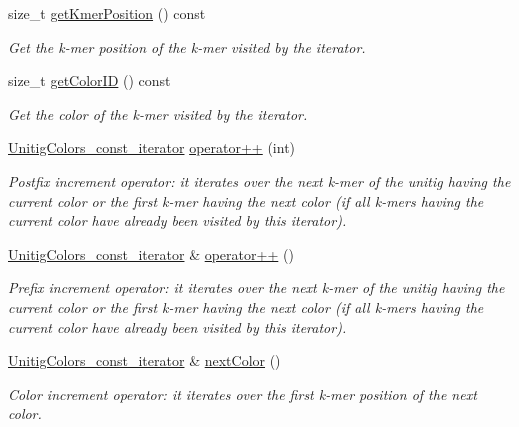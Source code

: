 \begin{DoxyCompactItemize}
size\+\_\+t \hyperlink{classUnitigColors_1_1UnitigColors__const__iterator_aac088e18802033a09a5ff1336522fbca}{get\+Kmer\+Position} () const
\begin{DoxyCompactList}\small\item\em Get the k-\/mer position of the k-\/mer visited by the iterator. \end{DoxyCompactList}\item 
size\+\_\+t \hyperlink{classUnitigColors_1_1UnitigColors__const__iterator_a1274e2d24b65f1b9ed2a473c9bf99302}{get\+Color\+ID} () const
\begin{DoxyCompactList}\small\item\em Get the color of the k-\/mer visited by the iterator. \end{DoxyCompactList}\item 
\hyperlink{classUnitigColors_1_1UnitigColors__const__iterator}{Unitig\+Colors\+\_\+const\+\_\+iterator} \hyperlink{classUnitigColors_1_1UnitigColors__const__iterator_a8ab4940bd251e29329edb8e0e46483b4}{operator++} (int)
\begin{DoxyCompactList}\small\item\em Postfix increment operator\+: it iterates over the next k-\/mer of the unitig having the current color or the first k-\/mer having the next color (if all k-\/mers having the current color have already been visited by this iterator). \end{DoxyCompactList}\item 
\hyperlink{classUnitigColors_1_1UnitigColors__const__iterator}{Unitig\+Colors\+\_\+const\+\_\+iterator} \& \hyperlink{classUnitigColors_1_1UnitigColors__const__iterator_acf6c4cff3345fa23053dbd9be046974f}{operator++} ()
\begin{DoxyCompactList}\small\item\em Prefix increment operator\+: it iterates over the next k-\/mer of the unitig having the current color or the first k-\/mer having the next color (if all k-\/mers having the current color have already been visited by this iterator). \end{DoxyCompactList}\item 
\hyperlink{classUnitigColors_1_1UnitigColors__const__iterator}{Unitig\+Colors\+\_\+const\+\_\+iterator} \& \hyperlink{classUnitigColors_1_1UnitigColors__const__iterator_ae7c489b968f06a0b713bd7244d75aeca}{next\+Color} ()
\begin{DoxyCompactList}\small\item\em Color increment operator\+: it iterates over the first k-\/mer position of the next color. \end{DoxyCompactList}\item 

\end{DoxyCompactItemize}
